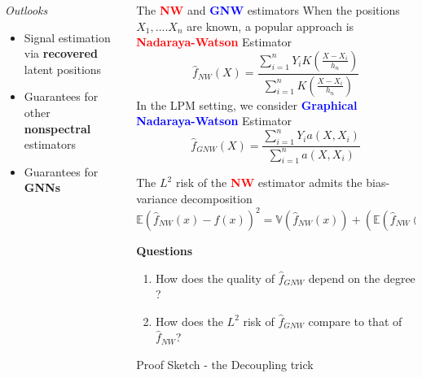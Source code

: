 \documentclass[final,dvipsnames]{beamer}
\makeatletter
\newcommand{\myemphh}[1]{\textbf{\textcolor{blue}{#1}}}
\newcommand{\myemphr}[1]{\textbf{\textcolor{red}{#1}}}
\newcommand{\mycolbackgreenw}[1]{
\hspace*{.01\linewidth}\begin{minipage}{.96\linewidth}
\begin{mdframed}[backgroundcolor=blue!10,linewidth=1pt]
\vspace{10pt}
#1
\vspace{10pt}
\end{mdframed}
\end{minipage}
}
\newcommand*{\rom}[1]{\expandafter\@slowromancap\romannumeral #1@}
\makeatother
\begin{document}
\begin{frame}
\begin{columns}[T]
\begin{column}{0.49\textwidth}
\begin{block}{\textit{Outlooks}}
    \begin{itemize}
        \item Signal estimation via \textbf{recovered} latent positions
        \item Guarantees for other \textbf{nonspectral} estimators
        \item Guarantees for \textbf{GNNs}
    \end{itemize}
\end{block}
\end{column}


\begin{column}{0.49\textwidth}
\begin{block}{The \myemphr{NW} and \myemphh{GNW} estimators \hspace*{\fill}{\large{\rom{2}}\qquad}}
When the positions $X_1,....X_n$ are known, a popular approach is \myemphr{Nadaraya-Watson} Estimator
\begin{equation*}
    \hat{f}_{NW}(X)=\frac{\sum_{i=1}^n Y_iK(\frac{X-X_i}{h_n})}{\sum_{i=1}^n K(\frac{X-X_i}{h_n})}
    \end{equation*}
In the LPM setting, we consider 
\myemphh{Graphical Nadaraya-Watson} Estimator
    \begin{equation*}
        \hat{f}_{GNW}(X)=\frac{\sum_{i=1}^n Y_i a(X,X_i)}{\sum_{i=1}^n a(X,X_i)}
    \end{equation*}

The $L^2$ risk of the \myemphr{NW} estimator admits the bias-variance decomposition 
\vspace{10pt}
\begin{equation*}
    \mathbb{E}(\hat{f}_{NW}(x)-f(x))^2=\mathbb{V}(\hat{f}_{NW}(x))+(\mathbb{E}(\hat{f}_{NW}(x))-f(x))^2
\end{equation*}
\mycolbackgreenw{\textbf{Questions}
\vspace{10pt}
\begin{center}
    \begin{enumerate}
        \item How does the quality of $\hat{f}_{GNW}$ depend on the degree ?
        \vspace{10pt}
        \item How does the $L^2$ risk of $\hat{f}_{GNW}$ compare to that of $\hat{f}_{NW}$?
    \end{enumerate}
\end{center}
}
\end{block}
\begin{block}{Proof Sketch - the Decoupling trick
    \hspace*{\fill}{\large{\rom{4}}\qquad}}


\end{block}
\end{column}
\end{columns}
\end{frame}
\end{document}
